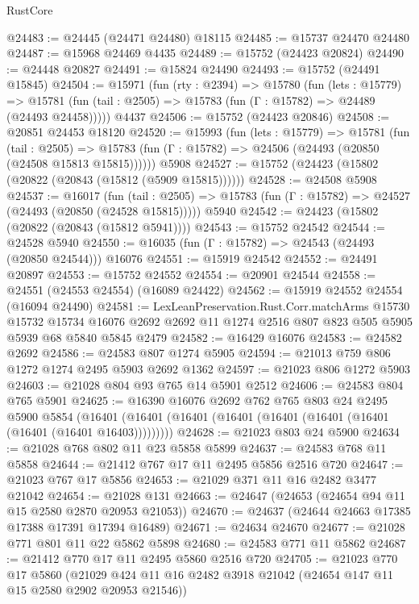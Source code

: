 \begin{lexlean}{RustCore}
\begin{coremodule}
@24483 := @24445 (@24471 @24480) @18115
@24485 := @15737 @24470 @24480
@24487 := @15968 @24469 @4435
@24489 := @15752 (@24423 @20824)
@24490 := @24448 @20827
@24491 := @15824 @24490
@24493 := @15752 (@24491 @15845)
@24504 := @15971
    (fun (rty : @2394) =>
    @15780
      (fun (lets : @15779) =>
      @15781 (fun (tail : @2505) => @15783 (fun (Γ : @15782) => @24489 (@24493 @24458)))))
    @4437
@24506 := @15752 (@24423 @20846)
@24508 := @20851 @24453 @18120
@24520 := @15993
    (fun (lets : @15779) =>
    @15781
      (fun (tail : @2505) =>
      @15783 (fun (Γ : @15782) => @24506 (@24493 (@20850 (@24508 @15813 @15815))))))
    @5908
@24527 := @15752 (@24423 (@15802 (@20822 (@20843 (@15812 (@5909 @15815))))))
@24528 := @24508 @5908
@24537 := @16017
    (fun (tail : @2505) => @15783 (fun (Γ : @15782) => @24527 (@24493 (@20850 (@24528 @15815)))))
    @5940
@24542 := @24423 (@15802 (@20822 (@20843 (@15812 @5941))))
@24543 := @15752 @24542
@24544 := @24528 @5940
@24550 := @16035 (fun (Γ : @15782) => @24543 (@24493 (@20850 @24544))) @16076
@24551 := @15919 @24542
@24552 := @24491 @20897
@24553 := @15752 @24552
@24554 := @20901 @24544
@24558 := @24551 (@24553 @24554) (@16089 @24422)
@24562 := @15919 @24552 @24554 (@16094 @24490)
@24581 := LexLeanPreservation.Rust.Corr.matchArms
    @15730
    @15732
    @15734
    @16076
    @2692
    @2692
    @11
    @1274
    @2516
    @807
    @823
    @505
    @5905
    @5939
    @68
    @5840
    @5845
    @2479
@24582 := @16429 @16076
@24583 := @24582 @2692
@24586 := @24583 @807 @1274 @5905
@24594 := @21013 @759 @806 @1272 @1274 @2495 @5903 @2692 @1362
@24597 := @21023 @806 @1272 @5903
@24603 := @21028 @804 @93 @765 @14 @5901 @2512
@24606 := @24583 @804 @765 @5901
@24625 := @16390
    @16076
    @2692
    @762
    @765
    @803
    @24
    @2495
    @5900
    @5854
    (@16401 (@16401 (@16401 (@16401 (@16401 (@16401 (@16401 (@16401 (@16401 @16403)))))))))
@24628 := @21023 @803 @24 @5900
@24634 := @21028 @768 @802 @11 @23 @5858 @5899
@24637 := @24583 @768 @11 @5858
@24644 := @21412 @767 @17 @11 @2495 @5856 @2516 @720
@24647 := @21023 @767 @17 @5856
@24653 := @21029 @371 @11 @16 @2482 @3477 @21042
@24654 := @21028 @131
@24663 := @24647 (@24653 (@24654 @94 @11 @15 @2580 @2870 @20953 @21053))
@24670 := @24637 (@24644 @24663 @17385 @17388 @17391 @17394 @16489)
@24671 := @24634 @24670
@24677 := @21028 @771 @801 @11 @22 @5862 @5898
@24680 := @24583 @771 @11 @5862
@24687 := @21412 @770 @17 @11 @2495 @5860 @2516 @720
@24705 := @21023
    @770
    @17
    @5860
    (@21029 @424 @11 @16 @2482 @3918 @21042 (@24654 @147 @11 @15 @2580 @2902 @20953 @21546))

\end{coremodule}
\end{lexlean}
